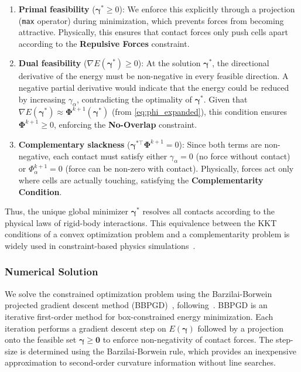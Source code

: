 \documentclass[a4paper,fleqn]{cas-dc}
\begin{document}
\begin{enumerate}
    \item \textbf{Primal feasibility} ($\boldsymbol{\gamma}^* \geq 0$): We enforce this explicitly through a projection (\texttt{max} operator) during minimization, which prevents forces from becoming attractive. Physically, this ensures that contact forces only push cells apart according to the \textbf{Repulsive Forces} constraint.

    \item \textbf{Dual feasibility} ($\nabla E(\boldsymbol{\gamma}^*) \geq 0$): At the solution $\boldsymbol{\gamma}^*$, the directional derivative of the energy must be non-negative in every feasible direction. A negative partial derivative would indicate that the energy could be reduced by increasing $\gamma_\alpha$, contradicting the optimality of $\boldsymbol{\gamma}^*$. Given that $\nabla E(\boldsymbol{\gamma}^*) \approx \boldsymbol{\Phi}^{k+1}(\boldsymbol{\gamma}^*)$ (from \autoref{eq:phi_expanded}), this condition ensures $\boldsymbol{\Phi}^{k+1} \geq 0$, enforcing the \textbf{No-Overlap} constraint.

    \item \textbf{Complementary slackness} ($\boldsymbol{\gamma}^{*\top} \boldsymbol{\Phi}^{k+1} = 0$): Since both terms are non-negative, each contact must satisfy either $\gamma_\alpha = 0$ (no force without contact) or $\Phi^{k+1}_\alpha = 0$ (force can be non-zero with contact). Physically, forces act only where cells are actually touching, satisfying the \textbf{Complementarity Condition}.
\end{enumerate}

Thus, the unique global minimizer $\boldsymbol{\gamma}^*$ resolves all contacts according to the physical laws of rigid-body interactions. This equivalence between the KKT conditions of a convex optimization problem and a complementarity problem is widely used in constraint-based physics simulations~\cite{Yan2022,Tasora2008, Yan2019, Li2021, Weady2024SM,Rudge2012,Macklin2014,Ferguson2021,CellModellerMaths}.

\subsubsection{Numerical Solution}

We solve the constrained optimization problem using the Barzilai-Borwein projected gradient descent method (BBPGD)~\cite{BBPGD}, following~\cite{Weady2024SM,Yan2019}. BBPGD is an iterative first-order method for box-constrained energy minimization. Each iteration performs a gradient descent step on $E(\boldsymbol{\gamma})$ followed by a projection onto the feasible set $\boldsymbol{\gamma} \geq \mathbf{0}$ to enforce non-negativity of contact forces. The step-size is determined using the Barzilai-Borwein rule, which provides an inexpensive approximation to second-order curvature information without line searches.
\end{document}
